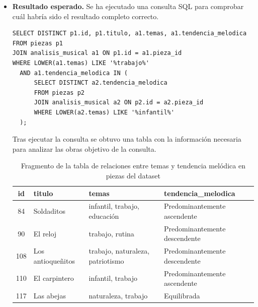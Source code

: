 \begin{itemize}
*   **ID 84** - Título: ""Soldaditos"" (Temas: infantil, trabajo, educación) - Intervalo frontera más frecuente: +2
*   **ID 90** - Título: ""El reloj"" (Temas: trabajo, rutina) - Intervalo frontera más frecuente: -2
*   **ID 108** - Título: ""Los antioqueñitos"" (Temas: trabajo, naturaleza, patriotismo) - Intervalo frontera más frecuente: 0
*   **ID 110** - Título: ""El carpintero"" (Temas: infantil, trabajo) - Intervalo frontera más frecuente: +2
*   **ID 117** - Título: ""Las abejas"" (Temas: naturaleza, trabajo) - Intervalo frontera más frecuente: -2
*   **ID 124** - Título: ""Himno del agricultor"" (Temas: trabajo, naturaleza) - Intervalo frontera más frecuente: -2
*   **ID 128** - Título: ""La fragua"" (Temas: naturaleza, trabajo) - Intervalo frontera más frecuente: 0
*   **ID 133** - Título: ""Las hormigas"" (Temas: trabajo, religión, amor) - Intervalo frontera más frecuente: +5
*   **ID 134** - Título: ""La aguja"" (Temas: trabajo, oficio) - Intervalo frontera más frecuente: +2
*   **ID 138** - Título: ""Las letras"" (Temas: educación, trabajo, ocioso) - Intervalo frontera más frecuente: +2"
\item \textbf{Resultado esperado.} Se ha ejecutado una consulta SQL para comprobar cuál habría sido el resultado completo correcto.
    \begin{verbatim}
SELECT DISTINCT p1.id, p1.titulo, a1.temas, a1.tendencia_melodica
FROM piezas p1
JOIN analisis_musical a1 ON p1.id = a1.pieza_id
WHERE LOWER(a1.temas) LIKE '%trabajo%'
  AND a1.tendencia_melodica IN (
      SELECT DISTINCT a2.tendencia_melodica
      FROM piezas p2
      JOIN analisis_musical a2 ON p2.id = a2.pieza_id
      WHERE LOWER(a2.temas) LIKE '%infantil%'
  );
    \end{verbatim}    
    Tras ejecutar la consulta se obtuvo una tabla con la información necesaria para analizar las obras objetivo de la consulta.
    
    \begin{table}[ht]
\centering
\begin{tabular}{|c|l|l|l|}
\hline
\textbf{id} & \textbf{titulo} & \textbf{temas} & \textbf{tendencia\_melodica} \\
\hline
84  & Soldaditos         & infantil, trabajo, educación              & Predominantemente ascendente \\
90  & El reloj           & trabajo, rutina                            & Predominantemente descendente \\
108 & Los antioqueñitos  & trabajo, naturaleza, patriotismo          & Predominantemente descendente \\
110 & El carpintero      & infantil, trabajo                          & Predominantemente ascendente \\
117 & Las abejas         & naturaleza, trabajo                        & Equilibrada \\
\hline
\end{tabular}
\caption{Fragmento de la tabla de relaciones entre temas y tendencia melódica en piezas del dataset}
\label{tab:temas_tendencia}
\end{table}
    

\end{itemize}
